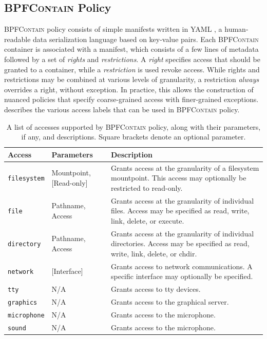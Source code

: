 \documentclass[dvipsnames, 12pt]{article}
\def\bpfcontain{\textsc{BPFContain}}
\begin{document}
\subsection{\bpfcontain{} Policy}
\label{sec:policy}

\bpfcontain{} policy consists of simple manifests written in YAML \cite{yaml},
a human-readable data serialization language based on key-value pairs.  Each
\bpfcontain{} container is associated with a manifest, which consists of a few lines
of metadata followed by a set of \textit{rights} and \textit{restrictions}.
A \textit{right} specifies access that should be granted to a container, while
a \textit{restriction} is used revoke access. While rights and restrictions may
be combined at various levels of granularity, a restriction \textit{always}
overrides a right, without exception. In practice, this allows the construction
of nuanced policies that specify coarse-grained access with finer-grained exceptions.
 describes the various access labels that can be used in
\bpfcontain{} policy.

\begin{table}[htpb]
  \centering
  \caption{
    A list of accesses supported by \bpfcontain{} policy, along with their
    parameters, if any, and descriptions. Square brackets denote an optional
    parameter.
  }
  \label{tab:accesses}
  \begin{tabular}{llp{20em}}
  \toprule
  Access              & Parameters              & Description \\
  \midrule
  \texttt{filesystem} & Mountpoint, [Read-only] &
    Grants access at the granularity of a filesystem mountpoint.
    This access may optionally be restricted to read-only. \\
  \texttt{file}       & Pathname, Access        &
    Grants access at the granularity of individual files.
    Access may be specified as read, write, link, delete, or execute. \\
  \texttt{directory}  & Pathname, Access        &
    Grants access at the granularity of individual directories.
    Access may be specified as read, write, link, delete, or chdir. \\
  \texttt{network}    & [Interface]             &
    Grants access to network communications.
    A specific interface may optionally be specified. \\
  \texttt{tty}        & N/A                     &
    Grants access to tty devices. \\
  \texttt{graphics}   & N/A                     &
    Grants access to the graphical server. \\
  \texttt{microphone} & N/A                     &
    Grants access to the microphone. \\
  \texttt{sound}      & N/A                     &
    Grants access to the microphone. \\
  \bottomrule
  \end{tabular}
\end{table}
\end{document}
